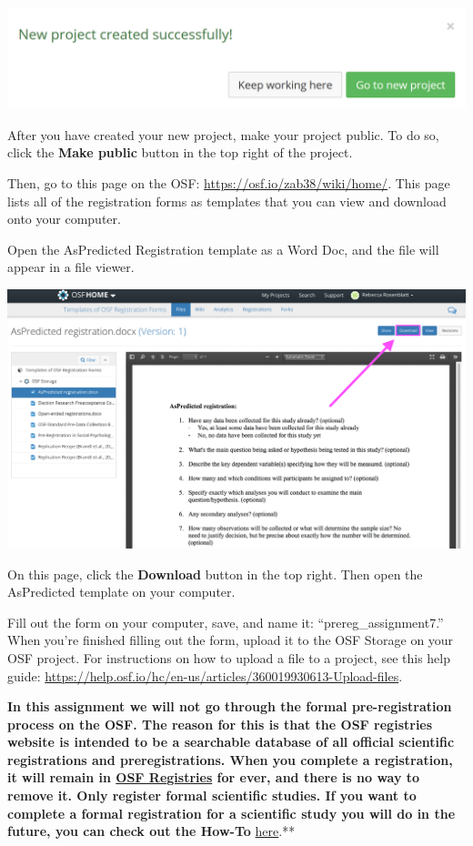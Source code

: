 \documentclass[
  oneside]{book}
\begin{document}
\begin{center}\includegraphics[width=1\linewidth]{images/34c3f0068911af6749513b1584c4cac7} \end{center}

After you have created your new project, make your project public. To do so,
click the \textbf{Make public} button in the top right of the project.

Then, go to this page on the OSF: \url{https://osf.io/zab38/wiki/home/}. This page
lists all of the registration forms as templates that you can view and download
onto your computer.

Open the AsPredicted Registration template as a Word Doc, and the file will
appear in a file viewer.

\begin{center}\includegraphics[width=1\linewidth]{images/895c7caf7508910ae52cc2d09e06f31c} \end{center}

On this page, click the \textbf{Download} button in the top right. Then open the
AsPredicted template on your computer.

Fill out the form on your computer, save, and name it: ``prereg\_assignment7.''
When you're finished filling out the form, upload it to the OSF Storage on your
OSF project. For instructions on how to upload a file to a project, see this
help guide: \url{https://help.osf.io/hc/en-us/articles/360019930613-Upload-files}.

\textbf{In this assignment we will not go through the formal pre-registration process on the OSF. The reason for this is that the OSF registries website is intended to be a searchable database of all official scientific registrations and preregistrations. When you complete a registration, it will remain in \href{https://osf.io/registries/}{OSF Registries} for ever, and there is no way to remove it. Only register formal scientific studies. If you want to complete a formal registration for a scientific study you will do in the future, you can check out the How-To} \href{https://help.osf.io/article/158-create-a-preregistration}{here}.**
\end{document}

